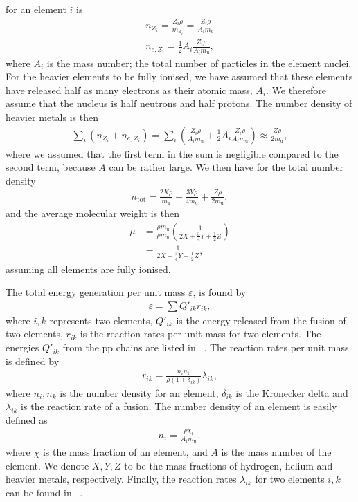\documentclass[a4paper, 11pt, english]{article}
\begin{document}
for an element $i$ is
\begin{align*}
	n_{Z_i} = \frac{Z_i \rho}{m_{Z_i}} = \frac{Z_i \rho}{A_i m_{\mathrm{u}}} \\
	n_{e,Z_i} = \frac{1}{2}A_i \frac{Z_i \rho}{A_i m_{\mathrm{u}}},
\end{align*}
where $A_i$ is the mass number; the total number of particles in the element nuclei. For
the heavier elements to be fully ionised, we have assumed that these elements have released
half as many electrons as their atomic mass, $A_i$. We therefore assume that the nucleus is
half neutrons and half protons. The
number density of heavier metals is then
\begin{align*}
	\sum\limits_i (n_{Z_i} + n_{e,Z_i}) = \sum\limits_i \left(\frac{Z_i \rho}{A_i
		m_{\mathrm{u}}} + \frac{1}{2}A_i \frac{Z_i \rho}{A_i m_{\mathrm{u}}} \right) \approx
		\frac{Z \rho}{2 m_{\mathrm{u}}},
\end{align*}
where we assumed that the first term in the sum is negligible compared to the second term,
because $A$ can be rather large. We then have for the total number density
\begin{align*}
	n_{\mathrm{tot}} = \frac{2 X \rho}{m_{\mathrm{u}}} + \frac{3 Y \rho}{4
		m_{\mathrm{u}}} + \frac{Z \rho}{2 m_{\mathrm{u}}},
\end{align*}
and the average molecular weight is then
\begin{align*}
	\mu &= \frac{\rho m_{\mathrm{u}}}{\rho m_{\mathrm{u}}} \left( \frac{1}{2X +
		\frac{3}{4}Y + \frac{1}{2}Z} \right) \\
		&= \frac{1}{2X +\frac{3}{4}Y + \frac{1}{2}Z},
\end{align*}
assuming all elements are fully ionised.

The total energy generation per unit mass $\varepsilon$, is found by
\begin{align}
	\varepsilon = \sum Q'_{ik} r_{ik},
	\label{eq:epsilon}
\end{align}
where $i,k$ represents two elements, $Q'_{ik}$ is the energy released from the fusion of
two elements, $r_{ik}$ is the reaction rates per unit mass for two elements. The energies
$Q'_{ik}$ from the pp chains are listed in ~\cite[p.~39, Table~2.1]{stix}. The reaction
rates per unit mass is defined by
\begin{align}
	r_{ik} = \frac{n_i n_k}{\rho(1 + \delta_{ik})} \lambda_{ik},
	\label{eq:r}
\end{align}
where $n_i,n_k$ is the number density for an element, $\delta_{ik}$ is the Kronecker delta and
$\lambda_{ik}$ is the reaction rate of a fusion. The number density of an element is
easily defined as
\begin{align}
	n_i = \frac{\rho \chi_i}{A_im_{\mathrm{u}}},
	\label{eq:n}
\end{align}
where $\chi$ is the mass fraction of an element, and $A$ is the mass number of the
element. We denote $X, Y, Z$ to be the mass fractions of hydrogen, helium and heavier
metals, respectively. Finally, the reaction rates $\lambda_{ik}$ for two elements
$i,k$ can be found in ~\cite[p.~46, Table~2.3]{stix}.
\end{document}
